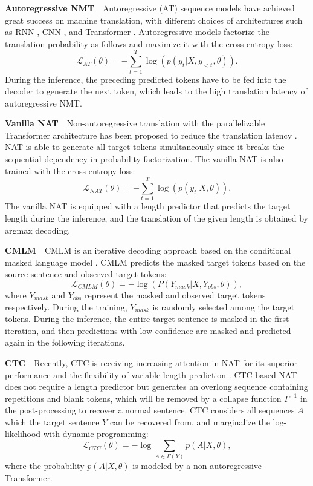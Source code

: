 \documentclass[letterpaper]{article} %
\begin{document}
\noindent{}\textbf{Autoregressive NMT}\ \ Autoregressive (AT) sequence models have achieved great success on machine translation, with different choices of architectures such as RNN \cite{bahdanau2014neural}, CNN \cite{gehring2017convolutional}, and Transformer \cite{vaswani2017attention}. Autoregressive models factorize the translation probability as follows and maximize it with the cross-entropy loss:
\begin{equation}
\mathcal{L}_{AT}(\theta) = -\sum_{t=1}^{T}\log(p(y_t|X,y_{<t},\theta)).
\end{equation}
During the inference, the preceding predicted tokens have to be fed into the decoder to generate the next token, which leads to the high translation latency of autoregressive NMT.

\noindent{}\textbf{Vanilla NAT}\ \ Non-autoregressive translation with the parallelizable Transformer architecture has been proposed to reduce the translation latency \cite{gu2017non}. NAT is able to generate all target tokens simultaneously since it breaks the sequential dependency in probability factorization. The vanilla NAT is also trained with the cross-entropy loss:
\begin{equation}
\label{eq:nat_mle}
\mathcal{L}_{NAT}(\theta) = -\sum_{t=1}^{T}\log(p(y_t|X,\theta)).
\end{equation}
The vanilla NAT is equipped with a length predictor that predicts the target length during the inference, and the translation of the given length is obtained by argmax decoding.

\noindent{}\textbf{CMLM}\ \ CMLM is an iterative decoding approach based on the conditional masked language model \cite{ghazvininejad2019maskpredict}. CMLM predicts the masked target tokens based on the source sentence and observed target tokens:
\begin{equation}
\mathcal{L}_{CMLM}(\theta) = -\log(P(Y_{mask}|X, Y_{obs},\theta)),
\end{equation}
where $Y_{mask}$ and $Y_{obs}$ represent the masked and observed target tokens respectively. During the training, $Y_{mask}$ is randomly selected among the target tokens. During the inference, the entire target sentence is masked in the first iteration, and then predictions with low confidence are masked and predicted again in the following iterations.

\noindent{}\textbf{CTC}\ \ Recently, CTC \cite{10.1145/1143844.1143891} is receiving increasing attention in NAT for its superior performance and the flexibility of variable length prediction \cite{libovicky2018end,saharia-etal-2020-non}. CTC-based NAT does not require a length predictor but generates an overlong sequence containing repetitions and blank tokens, which will be removed by a collapse function $\Gamma^{-1}$ in the post-processing to recover a normal sentence. CTC considers all sequences $A$ which the target sentence $Y$ can be recovered from, and marginalize the log-likelihood with dynamic programming:
\begin{equation}
 \mathcal{L}_{CTC}(\theta) = - \log \sum_{A \in \Gamma(Y)} p(A|X,\theta),
\end{equation}
where the probability $p(A|X,\theta)$ is modeled by a non-autoregressive Transformer.
\end{document}

